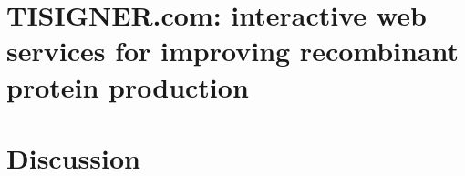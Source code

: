 \documentclass[]{lincolncsthesis}
\begin{document}
\chapter{TISIGNER.com: interactive web services for improving recombinant protein production}\label{chap:tisigner_webserver_issue}



\chapter{Discussion}



%
%
%
%
%
%
%
%
%
%

%

%


\end{document}
